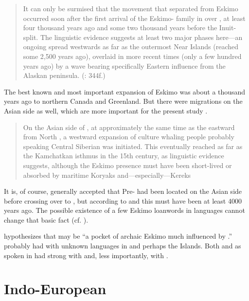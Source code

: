 \begin{quote}
It can only be surmised that the movement that separated  from Eskimo occurred soon after the first arrival of the Eskimo- family in  over , at least four thousand years ago and some two thousand years before the Inuit- split. The linguistic evidence suggests at least two major phases here---an ongoing spread westwards as far as the outermost Near Islands (reached some 2,500 years ago), overlaid in more recent times (only a few hundred years ago) by a wave bearing specifically Eastern  influence from the Alaskan peninsula. (\citealt{Fortescue2013}: 344f.)
\end{quote}

The best known and most important expansion of Eskimo was about a thousand years ago to northern Canada and Greenland. But there were migrations on the Asian side as well, which are more important for the present study \citep{Fortescue2004}.

\begin{quote}
On the Asian side of , at approximately the same time as the   eastward from North , a westward expansion of  culture whaling people probably speaking Central Siberian  was initiated. This eventually reached as far as the Kamchatkan isthmus in the 15th century, as linguistic evidence suggests, although the Eskimo presence must have been short-lived or absorbed by maritime Koryaks and---especially---Kereks \citep[344]{Fortescue2013}
\end{quote}

It is, of course, generally accepted that Pre- had been located on the Asian side before crossing over to , but according to \citet[558]{Berge2010} and \citet{Fortescue2013} this must have been at least 4000 years ago. The possible existence of a few Eskimo loanwords in  languages cannot change that basic fact (cf. \citealt{Vovin2015}).

\citet[344]{Fortescue2013} hypothesizes that  may be “a pocket of archaic Eskimo much influenced by .”  probably had  with unknown languages in  and perhaps the  Islands. Both  and  as spoken in  had strong  with  and, less importantly, with .

\section{Indo-European}\label{sec:2.5}

